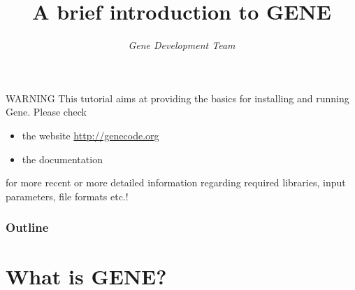 \documentclass[9pt]{beamer}
\title[GENE introduction]{\Large \bf A brief introduction to GENE}
\author{{\it Gene Development Team}}
\institute{\href{mailto:support@genecode.org}{support@genecode.org}}
\begin{document}
\begin{frame}[plain]
  \titlepage
\end{frame}


\begin{frame}[plain]
\begin{alertblock}{WARNING}
This tutorial aims at providing the basics for installing and running {\sc Gene}.
Please check
\begin{itemize}
 \item the website \url{http://genecode.org}
 \item the documentation
\end{itemize}
for more recent or more detailed information regarding required libraries, input parameters, file formats etc.!
\end{alertblock}

\end{frame}



\begin{frame}[plain]
  \frametitle{Outline}

  \tableofcontents

\end{frame}


\section{What is GENE?}
\end{document}

